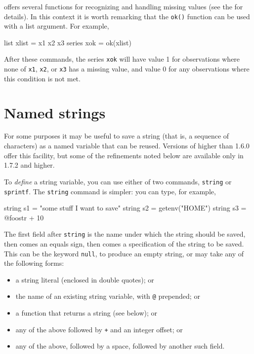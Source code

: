  offers several functions for recognizing and handling
missing values (see the \GCR{} for details). In this context it is
worth remarking that the \texttt{ok()} function can be used with a
list argument.  For example,
%
\begin{code}
list xlist = x1 x2 x3
series xok = ok(xlist)
\end{code}
%
After these commands, the series \texttt{xok} will have value 1 for
observations where none of \texttt{x1}, \texttt{x2}, or
\texttt{x3} has a missing value, and value 0 for any observations
where this condition is not met.


\section{Named strings}
\label{named-strings}

For some purposes it may be useful to save a string (that is, a
sequence of characters) as a named variable that can be reused.
Versions of  higher than 1.6.0 offer this facility, but
some of the refinements noted below are available only in 
1.7.2 and higher.

To \textit{define} a string variable, you can use either of two
commands, \texttt{string} or \texttt{sprintf}.  The \texttt{string}
command is simpler: you can type, for example,
%
\begin{code}
string s1 = "some stuff I want to save"
string s2 = getenv("HOME")
string s3 = @foostr + 10
\end{code}
%
The first field after \texttt{string} is the name under which the
string should be saved, then comes an equals sign, then comes a
specification of the string to be saved. This can be the keyword
\texttt{null}, to produce an empty string, or may take any of the 
following forms:

\begin{itemize}
\item a string literal (enclosed in double quotes); or
\item the name of an existing string variable, with \verb|@|
  prepended; or
\item a function that returns a string (see below); or
\item any of the above followed by \texttt{+} and an integer offset;
  or
\item any of the above, followed by a space, followed by another
  such field.
\end{itemize}

